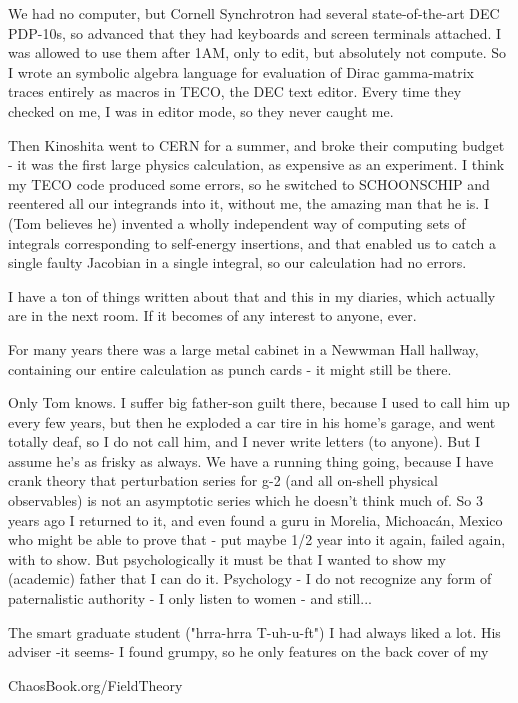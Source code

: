 \begin{description}
We had no computer, but Cornell Synchrotron had several state-of-the-art DEC PDP-10s, so advanced that they had keyboards and screen terminals attached. I was allowed to use them after 1AM, only to edit, but absolutely not compute. So I wrote an symbolic algebra language for evaluation of Dirac gamma-matrix traces entirely as macros in TECO, the DEC text editor. Every time they checked on me, I was in editor mode, so they never caught me.

Then Kinoshita went to CERN for a summer, and broke their computing budget - it was the first large physics calculation, as expensive as an experiment. I think my TECO code produced some errors, so he switched to SCHOONSCHIP and reentered all our integrands into it, without me, the amazing man that he is. I (Tom believes he) invented a wholly independent way of computing sets of integrals corresponding to self-energy insertions, and that enabled us to catch a single faulty Jacobian in a single integral, so our calculation had no errors.

I have a ton of things written about that and this in my diaries, which actually are in the next room. If it becomes of any interest to anyone, ever.

For many years there was a large metal cabinet in a Newwman Hall hallway, containing our entire calculation as punch cards - it might still be there.

Only Tom knows. I suffer big father-son guilt there, because I used to call him up every few years, but then he exploded a car tire in his home's garage, and went totally deaf, so I do not call him, and I never write letters (to anyone). But I assume he's as frisky as always. We have a running thing going, because I have crank theory that perturbation series for g-2 (and all on-shell physical observables) is not an asymptotic series which he doesn't think much of. So 3 years ago I returned to it, and even found a guru in Morelia, Michoacán, Mexico who might be able to prove that - put maybe 1/2 year into it again, failed again, with to show. But psychologically it must be that I wanted to show my (academic) father that I can do it. Psychology - I do not recognize any form of paternalistic authority - I only listen to women - and still...

The smart graduate student ("hrra-hrra T-uh-u-ft") I had always liked a lot. His adviser -it seems- I found grumpy, so he only features on the back cover of my

{ChaosBook.org/FieldTheory}


\end{description}
